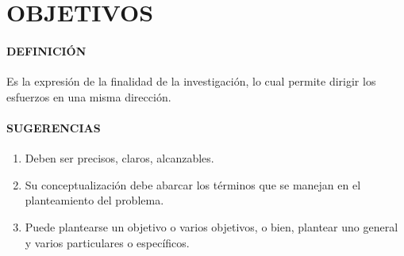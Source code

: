 \section{OBJETIVOS}

\paragraph{DEFINICIÓN}
Es la expresión de la finalidad de la investigación, lo cual permite dirigir los esfuerzos en una misma dirección.

\paragraph{SUGERENCIAS}

\begin{enumerate}
 \item Deben ser precisos, claros, alcanzables.
 \item Su conceptualización debe abarcar los términos que se manejan en el planteamiento del problema.
 \item Puede plantearse un objetivo o varios objetivos, o bien, plantear uno general y varios particulares o específicos.
\end{enumerate}